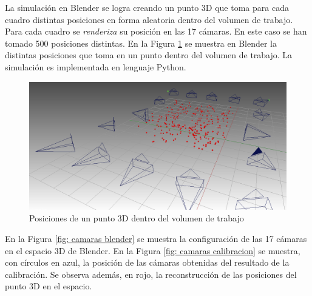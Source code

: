 La simulación en Blender se logra creando un punto 3D que toma para cada cuadro distintas posiciones en forma aleatoria dentro del volumen de trabajo. Para cada cuadro se \textit{renderiza} su posición en las 17 cámaras. En este caso se han tomado 500 posiciones distintas. En la Figura \ref{fig: blender toolbox laser} se muestra en Blender la distintas posiciones que toma en un punto dentro del volumen de trabajo. La simulación es implementada en lenguaje Python.

\begin{figure}[ht!]
\begin{center}
\includegraphics[scale=0.22]{img/calibracion/blender_toolbox_laser.png}
\end{center}
\caption{Posiciones de un punto 3D dentro del volumen de trabajo}
\label{fig: blender toolbox laser}
\end{figure}

En la Figura \ref{fig: camaras blender} se muestra la configuración de las 17 cámaras en el espacio 3D de Blender. En la Figura \ref{fig: camaras calibracion} se muestra, con círculos en azul, la posición de las cámaras obtenidas del resultado de la calibración. Se observa además, en rojo, la reconstrucción de las posiciones del punto 3D en el espacio. 



